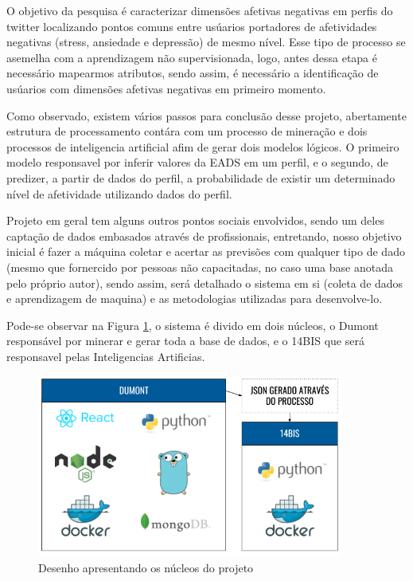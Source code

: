 O objetivo da pesquisa é caracterizar dimensões afetivas negativas em perfis do twitter localizando pontos comuns entre usúarios portadores de afetividades negativas (stress, ansiedade e depressão) de mesmo nível. Esse tipo de processo se asemelha com a aprendizagem não supervisionada, logo, antes dessa etapa é necessário mapearmos atributos, sendo assim, é necessário a identificação de usúarios com dimensões afetivas negativas em primeiro momento.

Como observado, existem vários passos para conclusão desse projeto, abertamente estrutura de processamento contára com um processo de mineração e dois processos de inteligencia artificial afim de gerar dois modelos lógicos. O primeiro modelo responsavel por inferir valores da EADS em um perfil, e o segundo, de predizer, a partir de dados do perfil, a probabilidade de existir um determinado nível de afetividade utilizando dados do perfil.

Projeto em geral tem alguns outros pontos sociais envolvidos, sendo um deles captação de dados embasados através de profissionais, entretando, nosso objetivo inicial é fazer a máquina coletar e acertar as previsões com qualquer tipo de dado (mesmo que fornercido por pessoas não capacitadas, no caso uma base anotada pelo próprio autor), sendo assim, será detalhado o sistema em si (coleta de dados e aprendizagem de maquina) e as metodologias utilizadas para desenvolve-lo.

Pode-se observar na Figura \ref{fig:tecnologias}, o sistema é divido em dois núcleos, o Dumont responsável por minerar e gerar toda a base de dados, e o 14BIS que será responsavel pelas Inteligencias Artificias.

\begin{figure}
    \centering
    \includegraphics[width=0.9\textwidth]{imagens/tecnologias.png}
    \caption{Desenho apresentando os núcleos do projeto}
    \label{fig:tecnologias}
\end{figure}

